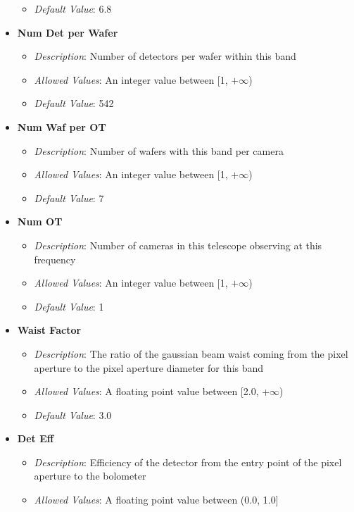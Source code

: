 \documentclass[11pt]{article} %
\begin{document}
\begin{itemize}[noitemsep,topsep=0pt]
\begin{itemize}[noitemsep,topsep=0pt]
		\item \textit{Default Value}: 6.8
		\end{itemize}
	\item \textbf{Num Det per Wafer}
		\begin{itemize}[noitemsep,topsep=0pt]
		\item \textit{Description}: Number of detectors per wafer within this band
		\item \textit{Allowed Values}: An integer value between [1, $+\infty$)
		\item \textit{Default Value}: 542
		\end{itemize}
	\item \textbf{Num Waf per OT}
		\begin{itemize}[noitemsep,topsep=0pt]
		\item \textit{Description}: Number of wafers with this band per camera
		\item \textit{Allowed Values}: An integer value between [1, $+\infty$)
		\item \textit{Default Value}: 7
		\end{itemize}
	\item \textbf{Num OT}
		\begin{itemize}[noitemsep,topsep=0pt]
		\item \textit{Description}: Number of cameras in this telescope observing at this frequency 
		\item \textit{Allowed Values}: An integer value between [1, $+\infty$)
		\item \textit{Default Value}: 1
		\end{itemize}
	\item \textbf{Waist Factor}
		\begin{itemize}[noitemsep,topsep=0pt]
		\item \textit{Description}: The ratio of the gaussian beam waist coming from the pixel aperture to the pixel aperture diameter for this band 
		\item \textit{Allowed Values}: A floating point value between [2.0, +$\infty$) 
		\item \textit{Default Value}: 3.0
		\end{itemize}
	\item \textbf{Det Eff}
		\begin{itemize}[noitemsep,topsep=0pt]
		\item \textit{Description}: Efficiency of the detector from the entry point of the pixel aperture to the bolometer
		\item \textit{Allowed Values}: A floating point value between (0.0, 1.0]

\end{itemize}
\end{itemize}
\end{document}
